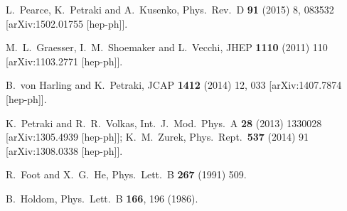 \documentclass[12pt]{article}
\begin{document}
\begin{thebibliography}{999}
  L.~Pearce, K.~Petraki and A.~Kusenko,
  Phys.\ Rev.\ D {\bf 91} (2015) 8,  083532
  [arXiv:1502.01755 [hep-ph]].
  
  M.~L.~Graesser, I.~M.~Shoemaker and L.~Vecchi,
  JHEP {\bf 1110} (2011) 110
  [arXiv:1103.2771 [hep-ph]].
  
  B.~von Harling and K.~Petraki,
  JCAP {\bf 1412} (2014) 12,  033
  [arXiv:1407.7874 [hep-ph]].

  K.~Petraki and R.~R.~Volkas,
  Int.\ J.\ Mod.\ Phys.\ A {\bf 28} (2013) 1330028
  [arXiv:1305.4939 [hep-ph]];
  K.~M.~Zurek,
  Phys.\ Rept.\  {\bf 537} (2014) 91
  [arXiv:1308.0338 [hep-ph]].
  
  R.~Foot and X.~G.~He,
  Phys.\ Lett.\ B {\bf 267} (1991) 509.
  
  B.~Holdom,
  Phys.\ Lett.\ B {\bf 166}, 196 (1986).
  

\end{thebibliography}
\end{document}
